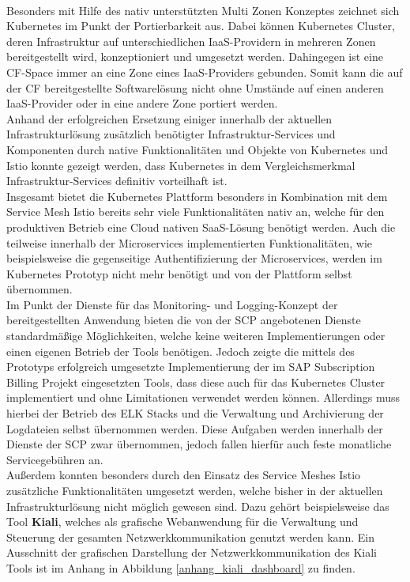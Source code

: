 \\
Besonders mit Hilfe des nativ unterstützten Multi Zonen Konzeptes zeichnet sich Kubernetes im Punkt der Portierbarkeit aus. Dabei können Kubernetes Cluster, deren Infrastruktur auf unterschiedlichen \ac{IaaS}-Providern in mehreren Zonen bereitgestellt wird, konzeptioniert und umgesetzt werden. Dahingegen ist eine \ac{CF}-Space immer an eine Zone eines \ac{IaaS}-Providers gebunden. Somit kann die auf der \ac{CF} bereitgestellte Softwarelösung nicht ohne Umstände auf einen anderen \ac{IaaS}-Provider oder in eine andere Zone portiert werden.\\
Anhand der erfolgreichen Ersetzung einiger innerhalb der aktuellen Infrastrukturlösung zusätzlich benötigter Infrastruktur-Services und Komponenten durch native Funktionalitäten und Objekte von Kubernetes und Istio konnte gezeigt werden, dass Kubernetes in dem Vergleichsmerkmal Infrastruktur-Services definitiv vorteilhaft ist. \\
Insgesamt bietet die Kubernetes Plattform besonders in Kombination mit dem Service Mesh Istio bereits sehr viele Funktionalitäten nativ an, welche für den produktiven Betrieb eine Cloud nativen \ac{SaaS}-Lösung benötigt werden. Auch die teilweise innerhalb der Microservices implementierten Funktionalitäten, wie beispielsweise die gegenseitige Authentifizierung der Microservices, werden im Kubernetes Prototyp nicht mehr benötigt und von der Plattform selbst übernommen.\\
Im Punkt der Dienste für das Monitoring- und Logging-Konzept der bereitgestellten Anwendung bieten die von der \ac{SCP} angebotenen Dienste standardmäßige Möglichkeiten, welche keine weiteren Implementierungen oder einen eigenen Betrieb der Tools benötigen. Jedoch zeigte die mittels des Prototyps erfolgreich umgesetzte Implementierung der im SAP Subscription Billing Projekt eingesetzten Tools, dass diese auch für das Kubernetes Cluster implementiert und ohne Limitationen verwendet werden können. Allerdings muss hierbei der Betrieb des ELK Stacks und die Verwaltung und Archivierung der Logdateien selbst übernommen werden. Diese Aufgaben werden innerhalb der Dienste der \ac{SCP} zwar übernommen, jedoch fallen hierfür auch feste monatliche Servicegebühren an.\\
Außerdem konnten besonders durch den Einsatz des Service Meshes Istio zusätzliche Funktionalitäten umgesetzt werden, welche bisher in der aktuellen Infrastrukturlösung nicht möglich gewesen sind. Dazu gehört beispielsweise das Tool \textbf{Kiali}, welches als grafische Webanwendung für die Verwaltung und Steuerung der gesamten Netzwerkkommunikation genutzt werden kann. Ein Ausschnitt der grafischen Darstellung der Netzwerkkommunikation des Kiali Tools ist im Anhang in Abbildung \ref{anhang_kiali_dashboard} zu finden.\\
